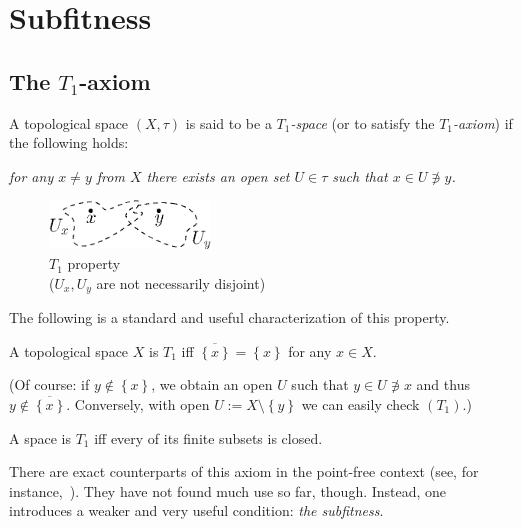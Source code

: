 \chapter{Subfitness}

\section{The $T_1$-axiom}

\begin{framed}
  \begin{df}[$T_1$]
    A topological space $(X, \tau)$ is said to be a \emph{$T_1$-space\/} (or to
    satisfy the \emph{$T_1$-axiom\/}) if the following holds:
    \begin{center} \it
      for any $x \ne y$ from $X$ there exists an open set $U\in \tau$ such that
      $x\in U \not\owns y$.
    \end{center}
  \end{df}
\end{framed}

\begin{figure}[h]
  \centering
  \includegraphics[height=13mm]{../img/t1.eps}
  \caption[$T_1$ property]{$T_1$ property\\
    ($U_x, U_y$ are not necessarily disjoint)}
\end{figure}

The following is a standard and useful characterization of this property.

\begin{fact} \label{T1Char}
  A topological space $X$ is $T_1$ iff $\overline{\left\{x\right\}} =
  \left\{x\right\}$ for any $x\in X$.
\end{fact}

(Of course:
if $y\not\in \left\{x\right\}$, we obtain an open $U$ such that $y\in
U\not\owns x$ and thus $y\not\in \overline{\left\{x\right\}}$.
Conversely, with open $U:= X\setminus \left\{y\right\}$ we can easily check
$(T_1)$.)

\begin{cor}
  A space is $T_1$ iff every of its finite subsets is closed.
\end{cor}

There are exact counterparts of this axiom in the point-free context (see, for
instance,~\cite{ds72}).
They have not found much use so far, though.
Instead, one introduces a weaker and very useful condition: {\sl the
subfitness\/}.

